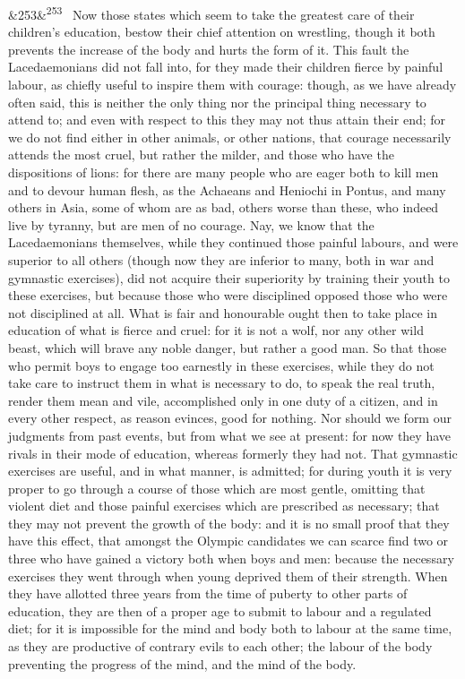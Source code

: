 \documentclass[12pt]{article}
\newcommand{\para}[1][]{\par\noindent\ifx&#1&\else\textsuperscript{\footnotesize #1}~\fi}
\begin{document}
\para[253] Now those states which seem to take the greatest care of their children's education, bestow their chief attention on wrestling, though it both prevents the increase of the body and hurts the form of it. This fault the Lacedaemonians did not fall into, for they made their children fierce by painful labour, as chiefly useful to inspire them with courage: though, as we have already often said, this is neither the only thing nor the principal thing necessary to attend to; and even with respect to this they may not thus attain their end; for we do not find either in other animals, or other nations, that courage necessarily attends the most cruel, but rather the milder, and those who have the dispositions of lions: for there are many people who are eager both to kill men and to devour human flesh, as the Achaeans and Heniochi in Pontus, and many others in Asia, some of whom are as bad, others worse than these, who indeed live by tyranny, but are men of no courage. Nay, we know that the Lacedaemonians themselves, while they continued those painful labours, and were superior to all others (though now they are inferior to many, both in war and gymnastic exercises), did not acquire their superiority by training their youth to these exercises, but because those who were disciplined opposed those who were not disciplined at all. What is fair and honourable ought then to take place in education of what is fierce and cruel: for it is not a wolf, nor any other wild beast, which will brave any noble danger, but rather a good man. So that those who permit boys to engage too earnestly in these exercises, while they do not take care to instruct them in what is necessary to do, to speak the real truth, render them mean and vile, accomplished only in one duty of a citizen, and in every other respect, as reason evinces, good for nothing. Nor should we form our judgments from past events, but from what we see at present: for now they have rivals in their mode of education, whereas formerly they had not. That gymnastic exercises are useful, and in what manner, is admitted; for during youth it is very proper to go through a course of those which are most gentle, omitting that violent diet and those painful exercises which are prescribed as necessary; that they may not prevent the growth of the body: and it is no small proof that they have this effect, that amongst the Olympic candidates we can scarce find two or three who have gained a victory both when boys and men: because the necessary exercises they went through when young deprived them of their strength. When they have allotted three years from the time of puberty to other parts of education, they are then of a proper age to submit to labour and a regulated diet; for it is impossible for the mind and body both to labour at the same time, as they are productive of contrary evils to each other; the labour of the body preventing the progress of the mind, and the mind of the body.
\end{document}
